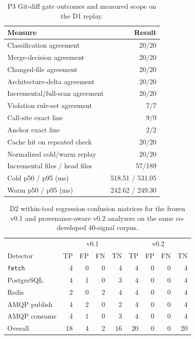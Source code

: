\begin{table}[t]
  \caption{P3 Git-diff gate outcomes and measured scope on the D1 replay.}
  \label{tab:phase3-results}
  \centering
  \small
  \begin{tabular}{lr}
    \hline
    Measure & Result \\
    \hline
    Classification agreement & 20/20 \\
    Merge-decision agreement & 20/20 \\
    Changed-file agreement & 20/20 \\
    Architecture-delta agreement & 20/20 \\
    Incremental/full-scan agreement & 20/20 \\
    Violation rule-set agreement & 7/7 \\
    Call-site exact line & 9/9 \\
    Anchor exact line & 2/2 \\
    Cache hit on repeated check & 20/20 \\
    Normalized cold/warm replay & 20/20 \\
    Incremental files / head files & 57/189 \\
    Cold p50 / p95 (ms) & 518.51 / 531.05 \\
    Warm p50 / p95 (ms) & 242.62 / 249.30 \\
    \hline
  \end{tabular}
\end{table}

\begin{table}[t]
  \caption{D2 within-tool regression confusion matrices for the frozen v0.1 and provenance-aware v0.2 analyzers on the same co-developed 40-signal corpus.}
  \label{tab:pattern-results}
  \centering
  \small
  \begin{tabular}{lrrrrrrrr}
    \hline
    & \multicolumn{4}{c}{v0.1} & \multicolumn{4}{c}{v0.2} \\
    Detector & TP & FP & FN & TN & TP & FP & FN & TN \\
    \hline
    \texttt{fetch} & 4 & 0 & 0 & 4 & 4 & 0 & 0 & 4 \\
    PostgreSQL & 4 & 1 & 0 & 3 & 4 & 0 & 0 & 4 \\
    Redis & 2 & 0 & 2 & 4 & 4 & 0 & 0 & 4 \\
    AMQP publish & 4 & 2 & 0 & 2 & 4 & 0 & 0 & 4 \\
    AMQP consume & 4 & 1 & 0 & 3 & 4 & 0 & 0 & 4 \\
    \hline
    Overall & 18 & 4 & 2 & 16 & 20 & 0 & 0 & 20 \\
    \hline
  \end{tabular}
\end{table}

